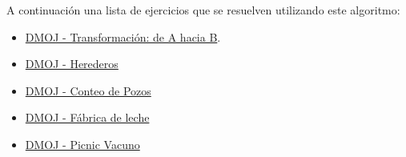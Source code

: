 A continuación una lista de ejercicios que se resuelven utilizando este algoritmo:

\begin{itemize}
	\item \href{https://dmoj.uclv.edu.cu/problem/froma2b}{DMOJ - Transformación: de A hacia B}. 
	\item \href{https://dmoj.uclv.edu.cu/problem/heredero}{DMOJ - Herederos}
	\item \href{https://dmoj.uclv.edu.cu/problem/lkcount}{DMOJ - Conteo de Pozos}
	\item \href{https://dmoj.uclv.edu.cu/problem/factory}{DMOJ - Fábrica de leche}
	\item \href{https://dmoj.uclv.edu.cu/problem/picnic}{DMOJ - Picnic Vacuno}
\end{itemize}
